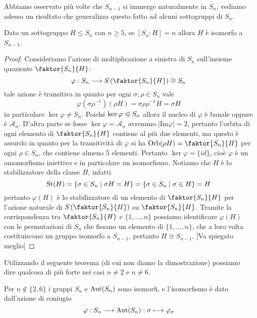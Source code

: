 \documentclass[11pt]{scrartcl}
\begin{document}
Abbiamo osservato più volte che $S_{n - 1}$ si immerge naturalmente in $S_n$,
vediamo adesso un risultato che generalizza questo fatto ad alcuni sottogruppi di 
$S_n$.

\begin{proposition}
    \label{prop1.68}
    Dato un sottogruppo $H\leqslant S_n$ con $n \geq 5$, se $[S_n : H] = n$ allora $H$ è 
    isomorfo a $S_{n - 1}$.
\end{proposition}

\begin{proof}
    Consideriamo l'azione di moltiplicazione a sinistra di $S_n$ sull'insieme
    quoziente $\faktor{S_n}{H}$:
    \[
        \varphi: S_n\longrightarrow S\left(\faktor{S_n}{H}\right) \cong S_n
    \]
    tale azione è transitiva in quanto per ogni $\sigma, \rho \in S_n$ vale
    \[
        \varphi(\sigma\rho^{-1})(\rho H) = \sigma \rho\rho^{-1}H = \sigma H
    \]
    in particolare $\ker \varphi \neq S_n$. Poiché $\ker\varphi \trianglelefteqslant S_n$
    allora il nucleo di $\varphi$ è banale oppure è $\mathcal{A}_n$. D'altra 
    parte se fosse $\ker \varphi = \mathcal{A}_n$ avremmo $|\mathrm{Im}\varphi| = 2$,
    pertanto l'orbita di ogni elemento di $\faktor{S_n}{H}$ contiene al più 
    due elementi, ma questo è assurdo in quanto per la transitività di $\varphi$
    si ha $\Orb(\rho H) = \faktor{S_n}{H}$ per ogni $\rho \in S_n$, che contiene almeno $5$ elementi.
    Pertanto $\ker\varphi = \{id\}$, cioè $\varphi$ è un omomorfismo iniettivo e
    in particolare un isomorfismo.
    Notiamo che $H$ è lo stabilizzatore della classe $H$, infatti
    \[
        \operatorname{St}(H) = \{\sigma \in S_n \mid \sigma H = H\} = \{\sigma \in S_n \mid \sigma \in H\} = H
    \]
    pertanto $\varphi(H)$ è lo stabilizzatore di un elemento di $\faktor{S_n}{H}$
    per l'azione naturale di $S\left(\faktor{S_n}{H}\right)$ su $\faktor{S_n}{H}$.
    Tramite la corrispondenza tra $\faktor{S_n}{H}$ e $\{1, \ldots, n\}$
    possiamo identificare $\varphi(H)$ con le permutazioni di $S_n$ che fissano
    un elemento di $\{1, \ldots, n\}$, che a loro volta costituiscono un 
    gruppo isomorfo a $S_{n - 1}$, pertanto $H \cong S_{n - 1}$.
    [Va spiegato meglio]
\end{proof}

Utilizzando il seguente teorema (di cui non diamo la dimostrazione) possiamo
dire qualcosa di più forte nei casi $n \neq 2$ e $n \neq 6$.

\begin{theorem}
    Per $n \notin \{2, 6\}$ i gruppi $S_n$ e $\operatorname{Aut}(S_n)$ sono isomorfi, e 
    l'isomorfismo è dato dall'azione di coniugio
    \[
        \varphi: S_n \longrightarrow \operatorname{Aut}(S_n): \sigma \longmapsto \varphi_{\sigma}
    \]
\end{theorem}
\end{document}
